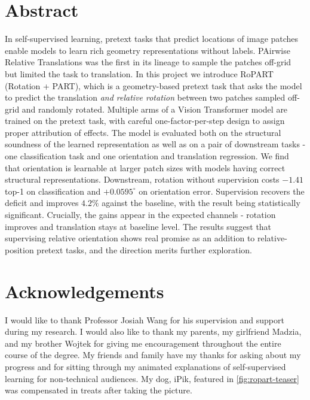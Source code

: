 \documentclass[a4paper, 11pt]{report}
\providecommand{\chaptertitle}{}
\newcommand{\ourchapterstar}[1]{\pagebreak\chapter*{#1}\renewcommand{\chaptertitle}{}}
\begin{document}



\setcounter{page}{1}
\setcounter{tocdepth}{2}

\ourchapterstar{Abstract}
In self-supervised learning, pretext tasks that predict locations of image patches enable models to learn rich geometry representations without labels. PAirwise Relative Translations was the first in its lineage to sample the patches off-grid but limited the task to translation. In this project we introduce RoPART (Rotation + PART), which is a geometry-based pretext task that asks the model to predict the translation \emph{and relative rotation} between two patches sampled off-grid and randomly rotated. Multiple arms of a Vision Transformer model are trained on the pretext task, with careful one-factor-per-step design to assign proper attribution of effects. The model is evaluated both on the structural soundness of the learned representation as well as on a pair of downstream tasks - one classification task and one orientation and translation regression. We find that orientation is learnable at larger patch sizes with models having correct structural representations. Downstream, rotation without supervision costs $-1.41$ top-1 on classification and $+0.0595^\circ$ on orientation error. Supervision recovers the deficit and improves $4.2\%$ against the baseline, with the result being statistically significant. Crucially, the gains appear in the expected channels - rotation improves and translation stays at baseline level. The results suggest that supervising relative orientation shows real promise as an addition to relative-position pretext tasks, and the direction merits further exploration.


\ourchapterstar{Acknowledgements}
I would like to thank Professor Josiah Wang for his supervision and support during my research. I would also like to thank my parents,  my girlfriend Madzia, and my brother Wojtek for giving me encouragement throughout the entire course of the degree. My friends and family have my thanks for asking about my progress and for sitting through my animated explanations of self-supervised learning for non-technical audiences. My dog, iPik, featured in \cref{fig:ropart-teaser} was compensated in treats after taking the picture.
\pagebreak
\tableofcontents

\pagebreak
{}

%
%
%
%
%
%

\pagebreak
{}
\renewcommand{\chaptertitle}{References}
\printbibliography[heading=bibintoc, title={References}]

%

\appendix
\renewcommand{\chaptertitle}{}
%
\end{document}

